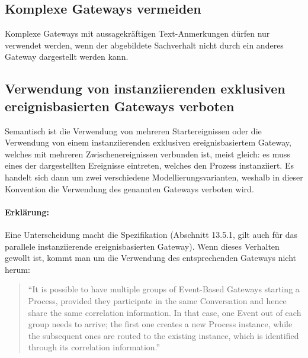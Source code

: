 \documentclass[12pt,report]{../../Templates/snetTeaching}
\begin{document}
\subsection{Komplexe Gateways vermeiden}

Komplexe Gateways mit aussagekräftigen Text-Anmerkungen dürfen nur verwendet werden, wenn der abgebildete Sachverhalt nicht durch ein anderes Gateway dargestellt werden kann.

\begin{Rahmen}
	\hfill
\end{Rahmen}


\clearpage
\subsection{Verwendung von instanziierenden exklusiven ereignisbasierten Gateways verboten}

Semantisch ist die Verwendung von mehreren Startereignissen oder die Verwendung von einem instanziierenden exklusiven ereignisbasiertem Gateway, welches mit mehreren Zwischenereignissen verbunden ist, meist gleich: es muss eines der dargestellten Ereignisse eintreten, welches den Prozess instanziiert. Es handelt sich dann um zwei verschiedene Modellierungsvarianten, weshalb in dieser Konvention die Verwendung des genannten Gateways verboten wird.

\begin{Rahmen}
	\hfill
\end{Rahmen}


\paragraph{Erklärung:} Eine Unterscheidung macht die Spezifikation (Abschnitt 13.5.1, gilt auch für das parallele instanziierende ereignisbasierten Gateway). Wenn dieses Verhalten gewollt ist, kommt man um die Verwendung des entsprechenden Gateways nicht herum:
\begin{quote}
“It is possible to have multiple groups of Event-Based Gateways starting a Process, provided they participate in the same Conversation and hence share the same correlation information. In that case, one Event out of each group needs to arrive; the first one creates a new Process instance, while the subsequent ones are routed to the existing instance, which is identified through its correlation information.” 
\end{quote}
\end{document}
